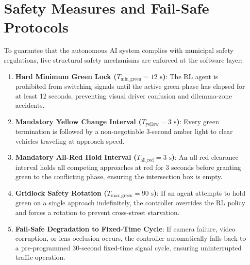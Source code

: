 \section{Safety Measures and Fail-Safe Protocols}
\label{sec:ch4_safety_measures}
To guarantee that the autonomous AI system complies with municipal safety regulations, five structural safety mechanisms are enforced at the software layer:
\begin{enumerate}
    \item \textbf{Hard Minimum Green Lock ($T_{\text{min\_green}} = 12\text{ s}$)}: The RL agent is prohibited from switching signals until the active green phase has elapsed for at least 12 seconds, preventing visual driver confusion and dilemma-zone accidents.
    \item \textbf{Mandatory Yellow Change Interval ($T_{\text{yellow}} = 3\text{ s}$)}: Every green termination is followed by a non-negotiable 3-second amber light to clear vehicles traveling at approach speed.
    \item \textbf{Mandatory All-Red Hold Interval ($T_{\text{all\_red}} = 3\text{ s}$)}: An all-red clearance interval holds all competing approaches at red for 3 seconds before granting green to the conflicting phase, ensuring the intersection box is empty.
    \item \textbf{Gridlock Safety Rotation ($T_{\text{max\_green}} = 90\text{ s}$)}: If an agent attempts to hold green on a single approach indefinitely, the controller overrides the RL policy and forces a rotation to prevent cross-street starvation.
    \item \textbf{Fail-Safe Degradation to Fixed-Time Cycle}: If camera failure, video corruption, or lens occlusion occurs, the controller automatically falls back to a pre-programmed 30-second fixed-time signal cycle, ensuring uninterrupted traffic operation.
\end{enumerate}
